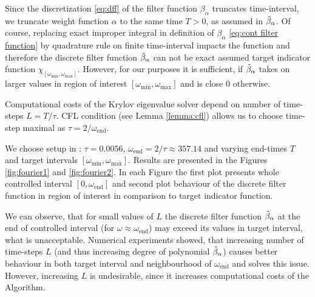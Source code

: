 \documentclass[a4paper,11pt,bibliography=totoc,listof=totoc,headinclude=true,cleardoublepage=empty,oneside]{scrbook}
\newcommand{\dff}{\Tilde{\beta}_\alpha}
\newcommand{\e}{\mathrm{end}}
\begin{document}
Since the discretization \eqref{eq:dff} of the filter function $\beta_\alpha$ truncates time-interval, we truncate weight function $\alpha$ to the same time $T>0$, as assumed in $\dff$. Of course, replacing exact improper integral in definition of $\beta_\alpha$ \eqref{eq:cont filter function} by quadrature rule on finite time-interval impacts the function and therefore the discrete filter function $\dff$ can not be exact assumed target indicator function $\chi_{\left[\omega_{\min}, \omega_{\max}\right]}$. However, for our purposes it is sufficient, if $\dff$ takes on larger values in region of interest $\left[\omega_{\min}, \omega_{\max}\right]$ and is close 0 otherwise. 

Computational costs of the Krylov eigenvalue solver depend on number of time-steps $L=T/\tau$. CFL condition (see Lemma \ref{lemma:cfl}) allows us to choose time-step maximal as $\tau = 2/\omega_{\e}$. 

We choose setup in \cite[section 3.1.2]{nannen}: $\tau = 0.0056$, $\omega_\e = 2/\tau \approx 357.14$ and varying end-times $T$ and target intervals $\left[\omega_{\min}, \omega_{\max}\right]$. Results are presented in the Figures \ref{fig:fourier1} and \ref{fig:fourier2}. In each Figure the first plot presents whole controlled interval $\left[0, \omega_\e\right]$ and second plot behaviour of the discrete filter function in region of interest in comparison to target indicator function.

We can observe, that for small values of $L$ the discrete filter function $\dff$ at the end of controlled interval (for $\omega \approx \omega_\e$) may exceed its values in target interval, what is unacceptable. Numerical experiments showed, that increasing number of time-steps $L$ (and thus increasing degree of polynomial $\dff$) causes better behaviour in both target interval and neighbourhood of $\omega_\e$ and solves this issue. However, increasing $L$ is undesirable, since it increases computational costs of the Algorithm.
\end{document}
